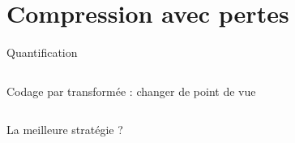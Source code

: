 \documentclass[9pt, aspectratio=169]{beamer}
\begin{document}
\section{Compression avec pertes}
\begin{frame}{} %
\begin{center}
\Huge \insertsection
\end{center}
\end{frame}

\begin{frame}{Quantification} %
\begin{columns}
   \begin{column}{0.6\textwidth}
		
   \end{column}
   \begin{column}{0.39\textwidth}
		
   \end{column}
\end{columns}
\end{frame}

\begin{frame}{Codage par transformée : changer de point de vue} %
\begin{columns}
   \begin{column}{0.6\textwidth}
		La meilleure stratégie ? 
  
        
        
   \end{column}
   \begin{column}{0.39\textwidth}
		
   \end{column}
\end{columns}
\end{frame}
\end{document}
